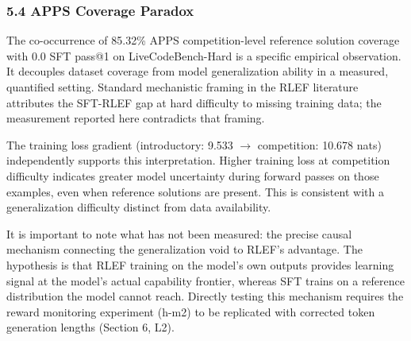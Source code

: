 \subsubsection{5.4 APPS Coverage Paradox}

The co-occurrence of 85.32\% APPS competition-level reference solution coverage with 0.0 SFT pass@1 on LiveCodeBench-Hard is a specific empirical observation. It decouples dataset coverage from model generalization ability in a measured, quantified setting. Standard mechanistic framing in the RLEF literature attributes the SFT-RLEF gap at hard difficulty to missing training data; the measurement reported here contradicts that framing.

The training loss gradient (introductory: 9.533 $\rightarrow$ competition: 10.678 nats) independently supports this interpretation. Higher training loss at competition difficulty indicates greater model uncertainty during forward passes on those examples, even when reference solutions are present. This is consistent with a generalization difficulty distinct from data availability.

It is important to note what has not been measured: the precise causal mechanism connecting the generalization void to RLEF's advantage. The hypothesis is that RLEF training on the model's own outputs provides learning signal at the model's actual capability frontier, whereas SFT trains on a reference distribution the model cannot reach. Directly testing this mechanism requires the reward monitoring experiment (h-m2) to be replicated with corrected token generation lengths (Section 6, L2).

